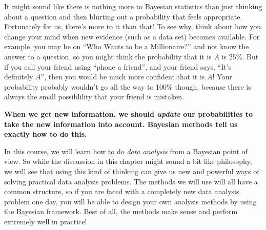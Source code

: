 It might sound like there is nothing more to Bayesian statistics than just
thinking about a question and then blurting out a probability that feels
appropriate. Fortunately for us, there's more to it than that! To see why, think
about how you change your mind when new evidence (such as a data set) becomes
available. For example, you may be on ``Who Wants to be a Millionaire?'' and
not know the answer to a question, so you might think the probability that it is
$A$ is 25\%. But if you call your friend using ``phone a friend'', and
your friend says,
``It's definitely $A$'', then you would be much more confident that it is $A$!
Your probability probably wouldn't go all the way to 100\% though, because there
is always the small possiblility that your friend is mistaken.

\begin{framed}
{\bf When we get new information, we should {\it update} our probabilities to
take the new information into account. Bayesian methods tell us exactly how to
do this.}
\end{framed}

In this course, we will learn how to do {\it data analysis} from a Bayesian
point of view. So while the discussion in this chapter might sound a bit
like philosophy, we will see that using this kind of thinking can give us
new and powerful ways of solving practical data analysis problems. The methods we will use
will all have a common structure, so if you are faced with a completely new
data analysis problem one day, you will be able to design your own analysis
methods by using the Bayesian framework. Best of all, the methods make sense
and perform extremely well in practice!

